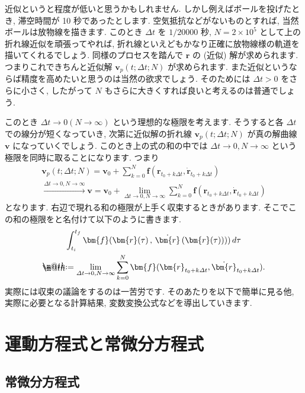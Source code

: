 \documentclass[openany, a4paper, oneside]{jsbook}
\makeatletter
\newcommand*{\defeq}{\mathrel{\rlap{%
\raisebox{0.3ex}{$\m@th\cdot$}}%
\raisebox{-0.3ex}{$\m@th\cdot$}}%
=}
\theoremstyle{break}
\theoremstyle{breakdefn}
\newcommand{\deltat}{\varDelta t}
\makeatother
\begin{document}
近似というと程度が低いと思うかもしれません.
しかし例えばボールを投げたとき, 滞空時間が 10 秒であったとします.
空気抵抗などがないものとすれば, 当然ボールは放物線を描きます.
このとき $\deltat$ を $1/20000$ 秒,  $N=2 \times 10^5$ として上の折れ線近似を頑張ってやれば,
折れ線といえどもかなり正確に放物線様の軌道を描いてくれるでしょう.
同様のプロセスを踏んで $\bm{r}$ の (近似) 解が求められます.
つまりこれできちんと近似解 $\bm{v}_p ( t ; \deltat ;N)$ が求められます.
また近似というならば精度を高めたいと思うのは当然の欲求でしょう.
そのためには $\deltat>0$ をさらに小さく, したがって $N$ もさらに大きくすれば良いと考えるのは普通でしょう.

このとき $\deltat \to 0 ( N \to \infty)$ という理想的な極限を考えます.
そうすると各 $\deltat$ での線分が短くなっていき,
次第に近似解の折れ線 $\bm{v}_p ( t ; \deltat ; N )$ が真の解曲線 $\bm{v}$ になっていくでしょう.
このとき上の式の和の中では $\deltat \to 0 , N \to \infty$ という極限を同時に取ることになります.
つまり
\begin{gather}
\bm{v}_p ( t ; \deltat ; N )
=
\bm{v}_0 + \sum_{k=0}^N \bm{f} ( \bm{r}_{ t_0 + k \deltat } , \dot{ \bm{r} }_{t_0 + k \deltat} )\\
\xrightarrow{\deltat \to 0 , N \to \infty}
\bm{v}
=
\bm{v}_0 + \lim_{ \deltat \to 0 , N \to \infty }
\sum_{k=0}^N \bm{f} ( \bm{r}_{ t_0 + k \deltat } , \dot{ \bm{r} }_{t_0 + k \deltat} )
\end{gather}
となります.
右辺で現れる和の極限が上手く収束するときがあります.
そこでこの和の極限をと名付けて以下のように書きます.
\begin{gather}
\int _{t_i} ^{t_f}
\bm{f} ( \bm{r} (\tau ) \, , \, \dot{ \bm{r} } \, ( \bm{r} (\tau) ) ) ) \, d \tau  \\
\defeq
\lim_{ \deltat \to 0 , N \to \infty }
\sum_{k=0}^N \bm{f} ( \bm{r}_{ t_0 + k \deltat } , \dot{ \bm{r} }_{t_0 + k \deltat} ).
\end{gather}
実際には収束の議論をするのは一苦労です.
そのあたりを以下で簡単に見る他,
実際に必要となる計算結果, 変数変換公式などを導出していきます.
\section{運動方程式と常微分方程式}

\subsection{常微分方程式}
\end{document}
